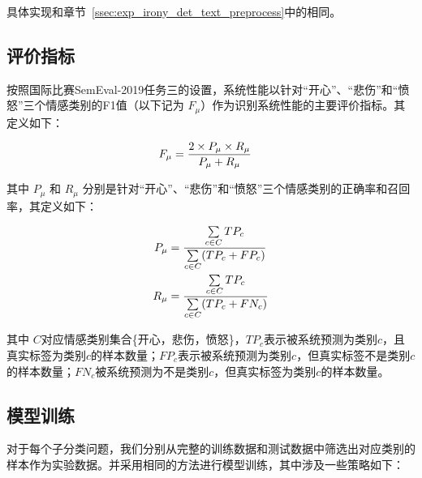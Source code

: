 具体实现和章节~\ref{ssec:exp_irony_det_text_preprocess}中的相同。

\subsection{评价指标}
\label{ssec:exp_context_emo_eval_metric}

按照国际比赛SemEval-2019任务三的设置，系统性能以针对“开心”、“悲伤”和“愤怒”三个情感类别的F1值（以下记为 $F_\mu$）作为识别系统性能的主要评价指标。其定义如下：

\vspace{-10mm}
\begin{equation}
\vspace{-2.5mm}
\begin{aligned}
  F_\mu &= \frac{2 \times P_\mu \times R_\mu}{P_\mu + R_\mu}
\end{aligned}
\end{equation}

其中 $P_\mu$ 和 $R_\mu$ 分别是针对“开心”、“悲伤”和“愤怒”三个情感类别的正确率和召回率，其定义如下：

\vspace{-10mm}
\begin{equation}
\vspace{-2.5mm}
\begin{aligned}
  P_\mu &= \frac{\sum\limits_{c \in C} TP_c}{\sum\limits_{c \in C}(TP_c + FP_c)} \\
  R_\mu &= \frac{\sum\limits_{c \in C} TP_c}{\sum\limits_{c \in C}(TP_c + FN_c)}
\end{aligned}
\end{equation}

其中 $C$对应情感类别集合\{开心，悲伤，愤怒\}，$TP_c$表示被系统预测为类别$c$，且真实标签为类别$c$的样本数量；$FP_c$表示被系统预测为类别$c$，但真实标签不是类别$c$的样本数量；$FN_c$被系统预测为不是类别$c$，但真实标签为类别$c$的样本数量。

\subsection{模型训练}
\label{ssec:exp_context_emo_model_training}

对于每个子分类问题，我们分别从完整的训练数据和测试数据中筛选出对应类别的样本作为实验数据。并采用相同的方法进行模型训练，其中涉及一些策略如下：

